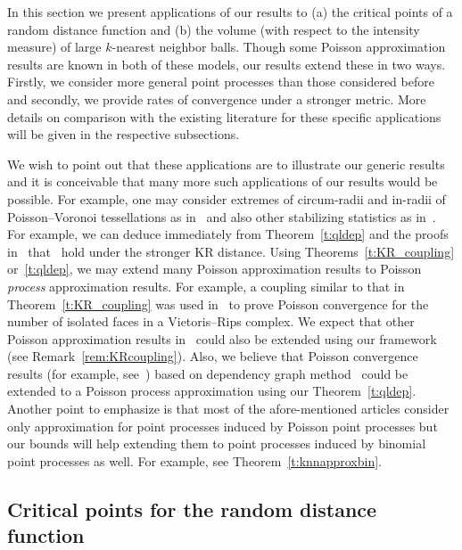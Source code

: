 \documentclass[10pt]{amsart}
\theoremstyle{definition}\newtheorem{defi}[theo]{Definition}\newtheorem{rema}[theo]{Remark}\newtheorem{exam}[theo]{Example}\newtheorem{exem}[theo]{Example}\newtheorem{nota}[theo]{Notation}
\begin{document}
In this section we present applications of our results to (a) the critical points of a random distance function and (b) {the volume (with respect to the intensity measure) of large $k$-nearest neighbor balls.} Though some Poisson approximation results are known in both of these models, our results extend these in two ways. Firstly, we consider more general point processes than those considered before and secondly, we provide rates of convergence under a stronger metric. More details on comparison with the existing literature for these specific applications will be given in the respective subsections.

We wish to point out that these applications are to illustrate our generic results and it is conceivable that many more such applications of our results would be possible. For example, one may consider extremes of circum-radii and in-radii of Poisson--Voronoi tessellations as in~\cite{Calkaextreme2014,Chenaviertessellations2014,PianoforteSchulte2021} and also other stabilizing statistics as in~\cite{Otto2020}. For example, we can deduce immediately from Theorem~\ref{t:qldep} and the proofs in~\cite{Otto2020} that~\cite[Theorems~4.2, 5.5 and~6.5]{Otto2020} hold under the stronger KR distance. Using Theorems~\ref{t:KR_coupling} or~\ref{t:qldep}, we may extend many Poisson approximation results to Poisson \emph{process} approximation results. For example, a coupling similar to that in Theorem~\ref{t:KR_coupling} was used in~\cite[Theorem~2.8]{Iyer2020} to prove Poisson convergence for the number of isolated faces in a Vietoris--Rips complex. We expect that other Poisson approximation results in~\cite{penrose_inhomogeneous_2018} could also be extended using our framework (see Remark~\ref{rem:KRcoupling}). Also, we believe that Poisson convergence results (for example, see~\cite[Theorem~2.1]{Owada2017}) based on dependency graph method~\cite{Arratia1989} could be extended to a Poisson process approximation using our Theorem~\ref{t:qldep}. Another point to emphasize is that most of the afore-mentioned articles consider only approximation for point processes induced by Poisson point processes but our bounds will help extending them to point processes induced by binomial point processes as well. For example, see Theorem~\ref{t:knnapproxbin}.

\subsection{Critical points for the random distance function}\label{s:critpoint_dist}
\end{document}
